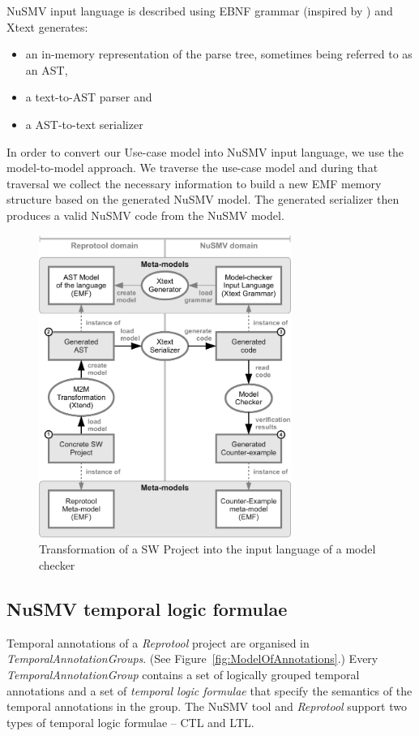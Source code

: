 NuSMV input language is described using EBNF grammar (inspired by \cite{googlecode-nusmv-tools}) and Xtext generates:
\begin{itemize}
  \item an in-memory representation of the parse tree, sometimes being referred to as an \ac{AST},
  \item a text-to-\ac{AST} parser and
  \item a \ac{AST}-to-text serializer
\end{itemize}

In order to convert our Use-case model into NuSMV input language, we use the model-to-model approach.
We traverse the use-case model and during that traversal we collect the necessary information to build a new \ac{EMF} memory structure based on the generated NuSMV model.
The generated serializer then produces a valid NuSMV code from the NuSMV model.

\begin{figure}[ht]
  \centering
  \includegraphics[height=280pt]{images/XtextWorkflow}
  \caption{Transformation of a SW Project into the input language of a model checker}
  \label{fig:XtextWorkflow}
\end{figure}
\pagebreak

\subsection{NuSMV temporal logic formulae}

Temporal annotations of a \emph{Reprotool} project are organised in \emph{TemporalAnnotationGroups}. (See Figure~\ref{fig:ModelOfAnnotations}.)
Every \emph{TemporalAnnotationGroup} contains a set of logically grouped temporal annotations and a set of \emph{temporal logic formulae}
that specify the semantics of the temporal annotations in the group.
The NuSMV tool and \emph{Reprotool} support two types of temporal logic formulae -- \ac{CTL} and \ac{LTL}.

